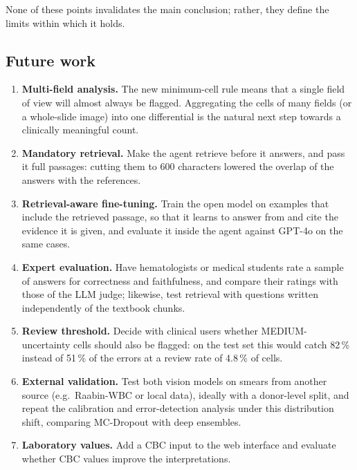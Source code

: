 None of these points invalidates the main conclusion; rather, they define the limits within which it holds.

\subsection{Future work}

\begin{enumerate}
  \item \textbf{Multi-field analysis.} The new minimum-cell rule means that a single field of view will almost always be flagged. Aggregating the cells of many fields (or a whole-slide image) into one differential is the natural next step towards a clinically meaningful count.
  \item \textbf{Mandatory retrieval.} Make the agent retrieve before it answers, and pass it full passages: cutting them to 600 characters lowered the overlap of the answers with the references.
  \item \textbf{Retrieval-aware fine-tuning.} Train the open model on examples that include the retrieved passage, so that it learns to answer from and cite the evidence it is given, and evaluate it inside the agent against GPT-4o on the same cases.
  \item \textbf{Expert evaluation.} Have hematologists or medical students rate a sample of answers for correctness and faithfulness, and compare their ratings with those of the LLM judge; likewise, test retrieval with questions written independently of the textbook chunks.
  \item \textbf{Review threshold.} Decide with clinical users whether MEDIUM-uncertainty cells should also be flagged: on the test set this would catch 82\,\% instead of 51\,\% of the errors at a review rate of 4.8\,\% of cells.
  \item \textbf{External validation.} Test both vision models on smears from another source (e.g.\ Raabin-WBC or local data), ideally with a donor-level split, and repeat the calibration and error-detection analysis under this distribution shift, comparing MC-Dropout with deep ensembles.
  \item \textbf{Laboratory values.} Add a CBC input to the web interface and evaluate whether CBC values improve the interpretations.
\end{enumerate}
